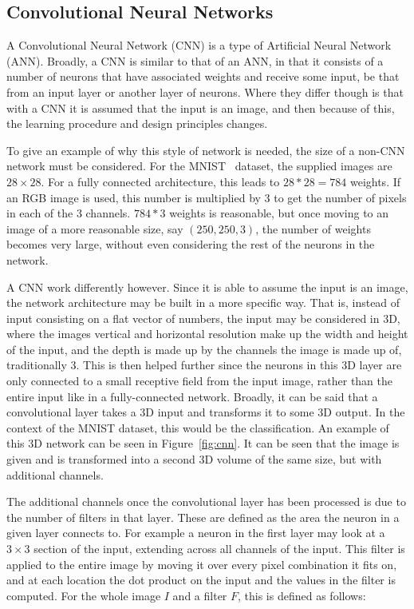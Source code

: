 \subsection{Convolutional Neural Networks}
A Convolutional Neural Network (CNN) is a type of Artificial Neural Network
(ANN). Broadly, a CNN is similar to that of an ANN, in that it consists of a
number of neurons that have associated weights and receive some input, be that
from an input layer or another layer of neurons. Where they differ though is
that with a CNN it is assumed that the input is an image, and then because of
this, the learning procedure and design principles changes.

To give an example of why this style of network is needed, the size of a non-CNN
network must be considered. For the MNIST~\cite{lecun2010mnist} dataset, the
supplied images are $28 \times 28$. For a fully connected architecture, this
leads to $28 * 28 = 784$ weights. If an RGB image is used, this number is
multiplied by 3 to get the number of pixels in each of the 3 channels. $784 * 3$
weights is reasonable, but once moving to an image of a more reasonable size,
say $(250, 250, 3)$, the number of weights becomes very large, without even
considering the rest of the neurons in the network.

A CNN work differently however. Since it is able to assume the input is an
image, the network architecture may be built in a more specific way. That is,
instead of input consisting on a flat vector of numbers, the input may be
considered in 3D, where the images vertical and horizontal resolution make up
the width and height of the input, and the depth is made up by the channels the
image is made up of, traditionally 3. This is then helped further since the
neurons in this 3D layer are only connected to a small receptive field from the
input image, rather than the entire input like in a fully-connected network.
Broadly, it can be said that a convolutional layer takes a 3D input and
transforms it to some 3D output. In the context of the MNIST dataset, this
would be the classification. An example of this 3D network can be seen in
Figure~\ref{fig:cnn}. It can be seen that the image is given and is transformed
into a second 3D volume of the same size, but with additional channels.

The additional channels once the convolutional layer has been processed is due
to the number of filters in that layer. These are defined as the area the
neuron in a given layer connects to. For example a neuron in the first layer
may look at a $3 \times 3$ section of the input, extending across all channels
of the input. This filter is applied to the entire image by moving it over every
pixel combination it fits on, and at each location the dot product on the input
and the values in the filter is computed. For the whole image $I$ and a filter
$F$, this is defined as follows:

